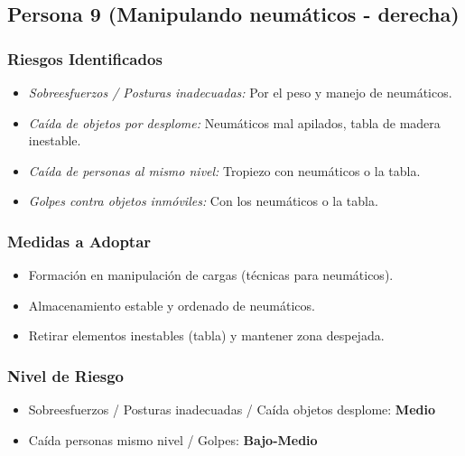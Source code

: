 \documentclass[12pt,a4paper]{article}
\begin{document}
	\bigskip\hrulefill\bigskip
	
	\subsection{Persona 9 (Manipulando neumáticos - derecha)}
	
	\subsubsection{Riesgos Identificados}
	\begin{itemize}
		\item \textit{Sobreesfuerzos / Posturas inadecuadas:} Por el peso y manejo de neumáticos.
		\item \textit{Caída de objetos por desplome:} Neumáticos mal apilados, tabla de madera inestable.
		\item \textit{Caída de personas al mismo nivel:} Tropiezo con neumáticos o la tabla.
		\item \textit{Golpes contra objetos inmóviles:} Con los neumáticos o la tabla.
	\end{itemize}
	
	\subsubsection{Medidas a Adoptar}
	\begin{itemize}
		\item Formación en manipulación de cargas (técnicas para neumáticos).
		\item Almacenamiento estable y ordenado de neumáticos.
		\item Retirar elementos inestables (tabla) y mantener zona despejada.
	\end{itemize}
	
	\subsubsection{Nivel de Riesgo}
	\begin{itemize}
		\item Sobreesfuerzos / Posturas inadecuadas / Caída objetos desplome: \textbf{Medio}
		\item Caída personas mismo nivel / Golpes: \textbf{Bajo-Medio}
	\end{itemize}
	
\end{document}
